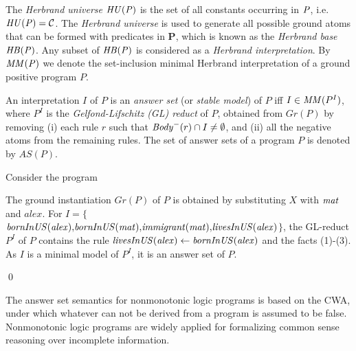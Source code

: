 \begin{definition}
The \emph{Herbrand universe}  $\mathit{HU(P)}$ is the set of all constants occurring in $\mathit{P}$, i.e.  $\mathit{HU(P)}=\mathcal{C}$. The \emph{Herbrand universe} is used to generate all possible ground atoms that can be formed with predicates in $\mathbf{P}$, which is known as the \emph{Herbrand base} $\mathit{HB(P)}$. Any subset of $\mathit{HB(P)}$ is considered as a \emph{Herbrand interpretation}. By $\mathit{MM(P)}$ we denote the set-inclusion minimal Herbrand interpretation of a ground positive program $P$.
\end{definition}

An interpretation $I$ of $P$ is an \emph{answer set} (or \emph{stable model}) of $P$ iff $I \in \mathit{MM}(P^I)$, where $P^I$ is the \emph{Gelfond-Lifschitz (GL) reduct} \cite{GL1988} of $P$, obtained from $Gr(P)$ by removing (i) each rule $r$ such that $\mathit{Body}^-(r) \cap I\neq\emptyset$, and (ii) all the negative atoms from the remaining rules. The set of answer sets of a program $P$ is denoted by $AS(P)$.
%
\begin{example}
Consider the program \\
{\small {}}
            
\normalsize
{\smallskip

\noindent            
The ground instantiation $Gr(P)$ of $P$ is obtained by substituting $X$ with $\mathit{mat}$ and ${alex}$. For $I{=}\{${\small$\mathit{bornInUS(alex){,}bornInUS(mat){,}immigrant(mat){,}livesInUS(alex)}$}$\}$, the GL-reduct $P^I$ of $P$ contains the rule $\mathit{livesInUS(alex)\leftarrow bornInUS(alex)}$ and the facts (1)-(3). As $I$ is a minimal model of $P^I$, it  is an answer set of $P$.}\qed
\end{example}

The answer set semantics for nonmonotonic logic programs is based on the CWA, under which whatever can not be derived from a program is assumed to be false. Nonmonotonic logic programs are widely applied for formalizing common sense reasoning over incomplete information.
